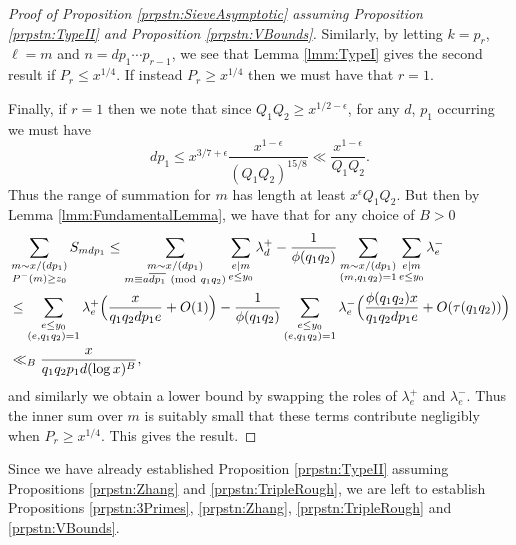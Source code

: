 \documentclass[10pt]{amsart}
\theoremstyle{plain}
\numberwithin{equation}{section}
\newcommand{\Mod}[1]{\ (\mathrm{mod}\ #1)}
\begin{document}
\begin{proof}[Proof of Proposition \ref{prpstn:SieveAsymptotic} assuming Proposition \ref{prpstn:TypeII} and Proposition \ref{prpstn:VBounds}]
Similarly, by letting $k=p_r$, $\ell=m$ and $n=d p_1\cdots p_{r-1}$, we see that Lemma \ref{lmm:TypeI} gives the second result if $P_r\le x^{1/4}$. If instead $P_r\ge x^{1/4}$ then we must have that $r=1$.

Finally, if $r=1$ then we note that since $Q_1Q_2\ge x^{1/2-\epsilon}$, for any $d$, $p_1$ occurring we must have
\[
d p_1\le x^{3/7+\epsilon}\frac{x^{1-\epsilon} }{(Q_1Q_2)^{15/8}}\ll \frac{x^{1-\epsilon}}{Q_1 Q_2}.
\]
Thus the range of summation for $m$ has length at least $x^\epsilon Q_1Q_2$. But then by Lemma \ref{lmm:FundamentalLemma}, we have that for any choice of $B>0$ 
\begin{align*}
&\sum_{\substack{m\sim x/(d p_1) \\ P^-(m)\ge z_0}}S_{m d p_1}\le \sum_{\substack{m\sim x/(d p_1) \\ m\equiv a\overline{d p_1}\Mod{q_1q_2}}}\sum_{\substack{e|m\\ e\le y_0}}\lambda^+_d-\frac{1}{\phi(q_1q_2)}\sum_{\substack{m\sim x/(d p_1) \\ (m,q_1q_2)=1}}\sum_{\substack{e|m\\ e\le y_0}}\lambda^-_e\\
&\le \sum_{\substack{e\le y_0\\ (e,q_1q_2)=1}}\lambda^+_e\Bigl(\frac{x}{q_1q_2 d p_1 e}+O(1)\Bigr)-\frac{1}{\phi(q_1q_2)}\sum_{\substack{e\le y_0\\ (e,q_1q_2)=1}}\lambda^-_e\Bigl(\frac{\phi(q_1q_2)x}{q_1q_2 d p_1e}+O(\tau(q_1q_2))\Bigr)\\
&\ll_B \frac{x}{q_1q_2p_1d (\log{x})^B},
\end{align*}
  and similarly we obtain a lower bound by swapping the roles of $\lambda^+_e$ and $\lambda^-_e$. Thus the inner sum over $m$ is suitably small that these terms contribute negligibly when $P_r\ge x^{1/4}$. This gives the result.
\end{proof}
%
%
%
%
%
%
%
%
Since we have already established Proposition \ref{prpstn:TypeII} assuming Propositions \ref{prpstn:Zhang} and \ref{prpstn:TripleRough}, we are left to establish Propositions \ref{prpstn:3Primes}, \ref{prpstn:Zhang}, \ref{prpstn:TripleRough} and \ref{prpstn:VBounds}.
%
%
%
%
%
%
%
%
%
%
%
%
%
%
%
%
%
%
\end{document}
